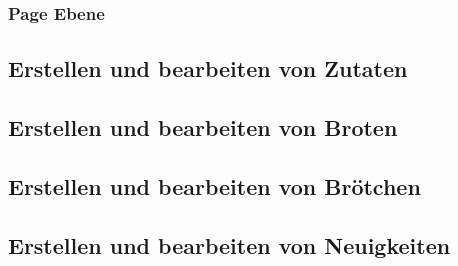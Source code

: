 \clearpage

\subsubsection{Page Ebene}

\clearpage

\subsection{Erstellen und bearbeiten von Zutaten}

\clearpage

\subsection{Erstellen und bearbeiten von Broten}

\clearpage

\subsection{Erstellen und bearbeiten von Brötchen}

\clearpage

\subsection{Erstellen und bearbeiten von Neuigkeiten}

\clearpage